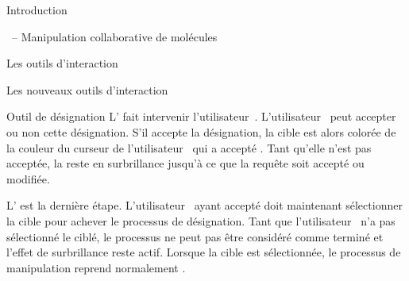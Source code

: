 \documentclass[myfrancais]{mythesis}
\begin{document}
\begin{mypart}{Introduction}
\begin{mychapter}{\myShaddock\ -- Manipulation collaborative de molécules}
\begin{mysection}{Les outils d'interaction}
\begin{mysubsection}{Les nouveaux outils d'interaction}
\begin{mysubsubsection}{Outil de désignation}
						L' fait intervenir l'utilisateur~.
						L'utilisateur~ peut accepter ou non cette désignation.
						S'il accepte la désignation, la cible est alors colorée de la couleur du curseur de l'utilisateur~ qui a accepté .
						Tant qu'elle n'est pas acceptée, la  reste en surbrillance jusqu'à ce que la requête soit accepté ou modifiée.

						L' est la dernière étape.
						L'utilisateur~ ayant accepté doit maintenant sélectionner la cible pour achever le processus de désignation.
						Tant que l'utilisateur~ n'a pas sélectionné le  ciblé, le processus ne peut pas être considéré comme terminé et l'effet de surbrillance reste actif.
						Lorsque la cible est sélectionnée, le processus de manipulation reprend normalement .
					\end{mysubsubsection}
				\end{mysubsection}
			\end{mysection}
		\end{mychapter}
	\end{mypart}
\end{document}
